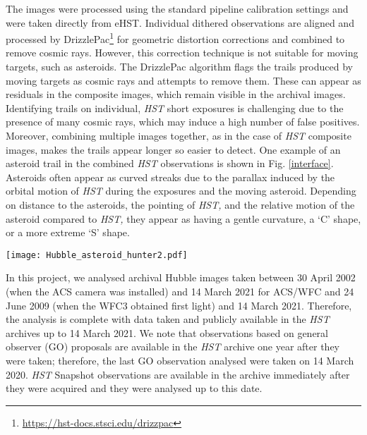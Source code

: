 \documentclass{aa}
\begin{document}
The images were processed using the standard pipeline calibration settings and were taken directly from eHST. Individual dithered observations are aligned and processed by DrizzlePac\footnote{\url{https://hst-docs.stsci.edu/drizzpac}} \citep{Gonzaga2012} for geometric distortion corrections and combined to remove cosmic rays. However, this correction technique is not suitable for moving targets, such as asteroids. The DrizzlePac algorithm flags the trails produced by moving targets as cosmic rays and attempts to remove them. These can appear as residuals in the composite images, which remain visible in the archival images. Identifying trails on individual, \textit{HST} short exposures is challenging due to the presence of many cosmic rays, which may induce a high number of false positives. Moreover, combining multiple images together, as in the case of \textit{HST} composite images, makes the trails appear longer so easier to detect. One example of an asteroid trail in the combined \textit{HST} observations is shown in Fig. \ref{interface}. Asteroids often appear as curved streaks due to the parallax induced by the orbital motion of \textit{HST} during the exposures and the moving asteroid. Depending on distance to the asteroids, the pointing of \textit{HST,} and the relative motion of the asteroid compared to \textit{HST,} they appear as having a gentle curvature, a `C' shape, or a more extreme `S' shape. 

\begin{figure*}
   \centering
   \texttt{[image: Hubble\_asteroid\_hunter2.pdf]}
   \caption{Image showing the classification interface of the Hubble Asteroid Hunter (\url{www.asteroidhunter.org}) citizen science project. Individual users are asked to inspect \textit{HST} image quadrants for asteroids and mark the beginning and end point of trails in the images. Markings from ten users are aggregated into a final classification. The asteroid trail is visible as a `C' shape in the bottom right of the exposure. There are gaps in the trail as the displayed cutout is an \textit{HST} composite exposure. The white arrow shows the position of the trail.}
    \label{interface}%
\end{figure*}


In this project, we analysed archival Hubble images taken between 30 April 2002 (when the ACS camera was installed) and 14 March 2021 for ACS/WFC and 24 June 2009 (when the WFC3 obtained first light) and 14 March 2021. Therefore, the analysis is complete with data taken and publicly available in the \textit{HST} archives up to 14 March 2021. We note that observations based on general observer (GO) proposals are available in the \textit{HST} archive one year after they were taken; therefore, the last GO observation analysed were taken on 14 March 2020. \textit{HST} Snapshot observations are available in the archive immediately after they were acquired and they were analysed up to this date.
\end{document}
